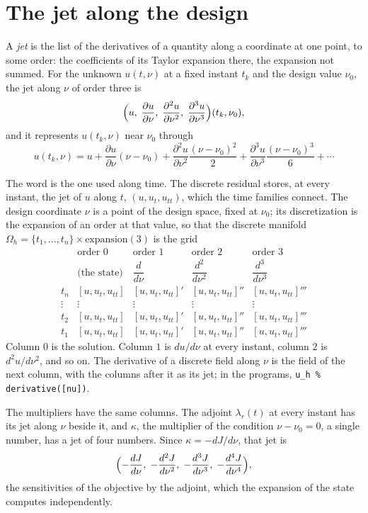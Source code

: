 \documentclass[10pt]{article}
\begin{document}
\section{The jet along the design}

A \emph{jet} is the list of the derivatives of a quantity along a
coordinate at one point, to some order: the coefficients of its
Taylor expansion there, the expansion not summed. For the unknown
$u(t, \nu)$ at a fixed instant $t_k$ and the design value $\nu_0$, the
jet along $\nu$ of order three is
\[
  \Bigl( u,\; \frac{\partial u}{\partial \nu},\;
         \frac{\partial^2 u}{\partial \nu^2},\;
         \frac{\partial^3 u}{\partial \nu^3} \Bigr)(t_k, \nu_0),
\]
and it represents $u(t_k, \nu)$ near $\nu_0$ through
\[
  u(t_k, \nu) = u + \frac{\partial u}{\partial \nu}(\nu - \nu_0)
  + \frac{\partial^2 u}{\partial \nu^2}\frac{(\nu - \nu_0)^2}{2}
  + \frac{\partial^3 u}{\partial \nu^3}\frac{(\nu - \nu_0)^3}{6} + \cdots
\]

The word is the one used along time. The discrete residual stores, at
every instant, the jet of $u$ along $t$, $(u, u_t, u_{tt})$, which the
time families connect. The design coordinate $\nu$ is a point of the
design space, fixed at $\nu_0$; its discretization is the expansion of
an order at that value, so that the discrete manifold
$\Omega_h = \{t_1, \ldots, t_n\} \times \mathrm{expansion}(3)$ is the
grid
\[
\begin{array}{c|cccc}
       & \text{order } 0 & \text{order } 1 & \text{order } 2 & \text{order } 3 \\
       & \text{(the state)} & \dfrac{d}{d\nu} & \dfrac{d^2}{d\nu^2} & \dfrac{d^3}{d\nu^3} \\[1ex]
\hline
  t_n  & [u, u_t, u_{tt}] & [u, u_t, u_{tt}]' & [u, u_t, u_{tt}]'' & [u, u_t, u_{tt}]''' \\
  \vdots & \vdots & \vdots & \vdots & \vdots \\
  t_2  & [u, u_t, u_{tt}] & [u, u_t, u_{tt}]' & [u, u_t, u_{tt}]'' & [u, u_t, u_{tt}]''' \\
  t_1  & [u, u_t, u_{tt}] & [u, u_t, u_{tt}]' & [u, u_t, u_{tt}]'' & [u, u_t, u_{tt}]'''
\end{array}
\]
Column $0$ is the solution. Column $1$ is $du/d\nu$ at every instant,
column $2$ is $d^2u/d\nu^2$, and so on. The derivative of a discrete
field along $\nu$ is the field of the next column, with the columns
after it as its jet; in the programs, \texttt{u\_h \% derivative([nu])}.

The multipliers have the same columns. The adjoint $\lambda_r(t)$ at
every instant has its jet along $\nu$ beside it, and $\kappa$, the
multiplier of the condition $\nu - \nu_0 = 0$, a single number, has a
jet of four numbers. Since $\kappa = -dJ/d\nu$, that jet is
\[
  \Bigl( -\frac{dJ}{d\nu},\; -\frac{d^2J}{d\nu^2},\;
         -\frac{d^3J}{d\nu^3},\; -\frac{d^4J}{d\nu^4} \Bigr),
\]
the sensitivities of the objective by the adjoint, which the expansion
of the state computes independently.
\end{document}
